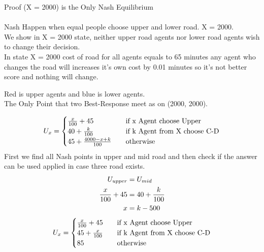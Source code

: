 \documentclass[
  course = {{IE579 Game Theory and Multi-Agent Reinforcement Learning}},
  assignment = 1,
  name = {{Mohammad Mahdi Rahimi}},
  studentnumber = {{20208244}},
  email = {{mahi@kaist.ac.kr}},
  firstexercise = 1
]{aga-homework}
\begin{document}
\subexercise Proof (X = 2000) is the Only Nash Equilibrium \\\\
Nash Happen when equal people choose upper and lower road. X = 2000.\\
We show in X = 2000 state, neither upper road agents nor lower road agents wish to change their decision.\\
In state X = 2000 cost of road for all agents equals to 65 minutes any agent who changes the road will increases it's own cost by 0.01 minutes so it's not better score and nothing will change.
\begin{center}
\end{center}
Red is upper agents and blue is lower agents.\\
The Only Point that two Best-Response meet as on (2000, 2000).

\subexercise
\[
U_{x} = 
     \begin{cases}
      {x \over 100} + 45 &\quad\text {if x Agent choose Upper} \\
      40 + {k\over 100} &\quad\text{if k Agent from X choose C-D}\\ 
      45 + {4000 - x + k \over 100} &\quad\text{otherwise}\\ 
     \end{cases}
\]
First we find all Nash points in upper and mid road and then check if the answer can be used applied in case three road exists.
\begin{equation} \label{eq1}
\begin{split}
    U_{upper} & = U_{mid}\\
    {x \over 100} + 45 & = 40 + {k \over 100}\\
    x & = k - 500
\end{split}
\end{equation}
\[
U_{x} = 
     \begin{cases}
      {x \over 100} + 45 &\quad\text {if x Agent choose Upper} \\
      45 + {x\over 100} &\quad\text{if k Agent from X choose C-D}\\ 
      85 &\quad\text{otherwise}\\ 
     \end{cases}
\]
\end{document}
